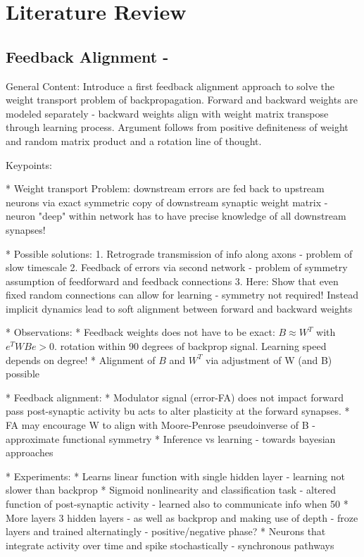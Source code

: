 \documentclass[colorinlistoftodos]{article}
\theoremstyle{definition}
\begin{document}
\newpage
\section{Literature Review}

\subsection*{Feedback Alignment - \citet{lillicrap2016}}

General Content: Introduce a first feedback alignment approach to solve the weight transport problem of backpropagation. Forward and backward weights are modeled separately - backward weights align with weight matrix transpose through learning process. Argument follows from positive definiteness of weight and random matrix product and a rotation line of thought.


Keypoints:

* Weight transport Problem: downstream errors are fed back to upstream neurons via exact symmetric copy of downstream synaptic weight matrix - neuron "deep" within network has to have precise knowledge of all downstream synapses!

* Possible solutions:
    1. Retrograde transmission of info along axons - problem of slow timescale
    2. Feedback of errors via second network - problem of symmetry assumption of feedforward and feedback connections
    3. Here: Show that even fixed random connections can allow for learning - symmetry not required! Instead implicit dynamics lead to soft alignment between forward and backward weights

* Observations:
    * Feedback weights does not have to be exact: $B \approx W^T$ with $e^TWBe > 0$. rotation within 90 degrees of backprop signal. Learning speed depends on degree!
    * Alignment of $B$ and $W^T$ via adjustment of W (and B) possible

* Feedback alignment:
    * Modulator signal (error-FA) does not impact forward pass post-synaptic activity bu acts to alter plasticity at the forward synapses.
    * FA may encourage W to align with Moore-Penrose pseudoinverse of B - approximate functional symmetry
    * Inference vs learning - towards bayesian approaches

* Experiments:
    * Learns linear function with single hidden layer - learning not slower than backprop
    * Sigmoid nonlinearity and classification task - altered function of post-synaptic activity - learned also to communicate info when 50%
    * More layers 3 hidden layers - as well as backprop and making use of depth - froze layers and trained alternatingly - positive/negative phase?
    * Neurons that integrate activity over time and spike stochastically - synchronous pathways
\end{document}
